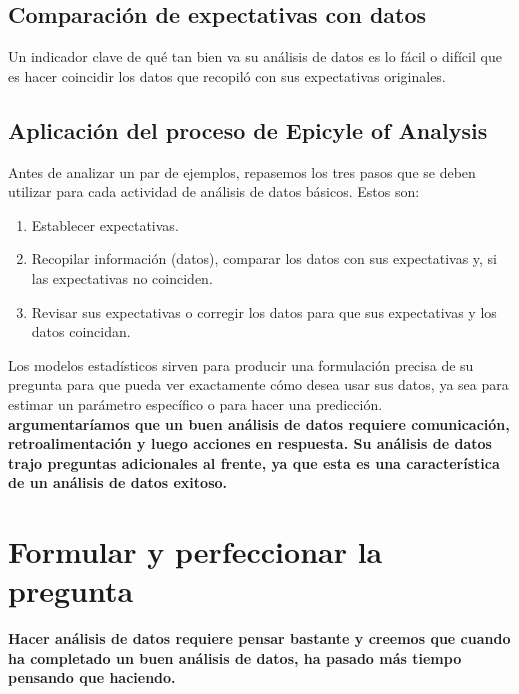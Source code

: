 \documentclass[10pt]{book}
\begin{document}
\section{Comparación de expectativas con datos}
Un indicador clave de qué tan bien va su análisis de datos es lo fácil o difícil que es hacer coincidir los datos que recopiló con sus expectativas originales.

\section{Aplicación del proceso de Epicyle of Analysis}
Antes de analizar un par de ejemplos, repasemos los tres pasos que se deben utilizar para cada actividad de análisis de datos básicos. Estos son: 
\begin{enumerate}[\bfseries 1.]
\item Establecer expectativas.
\item Recopilar información (datos), comparar los datos con sus expectativas y, si las expectativas no coinciden.
\item Revisar sus expectativas o corregir los datos para que sus expectativas y los datos coincidan.
\end{enumerate}
Los modelos estadísticos sirven para producir una formulación precisa de su pregunta para que pueda ver exactamente cómo desea usar sus datos, ya sea para estimar un parámetro específico o para hacer una predicción.\\
\textbf{argumentaríamos que un buen análisis de datos requiere comunicación, retroalimentación y luego acciones en respuesta. Su análisis de datos trajo preguntas adicionales al frente, ya que esta es una característica de un análisis de datos exitoso.}

\chapter{Formular y perfeccionar la pregunta}
\textbf{Hacer análisis de datos requiere pensar bastante y creemos que cuando ha completado un buen análisis de datos, ha pasado más tiempo pensando que haciendo.}
\end{document}
